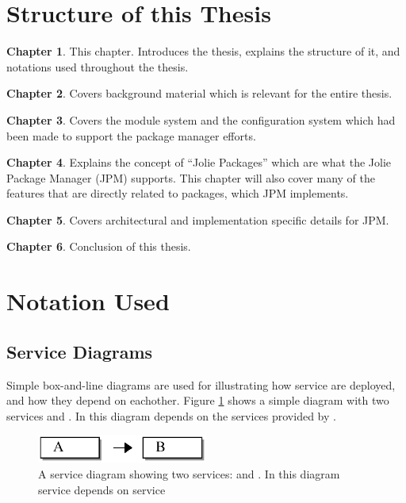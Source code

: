 \section{Structure of this Thesis}

\textbf{Chapter 1}. This chapter. Introduces the thesis, explains the structure
of it, and notations used throughout the thesis.

\textbf{Chapter 2}. Covers background material which is relevant for the entire
thesis.

\textbf{Chapter 3}. Covers the module system and the configuration system which
had been made to support the package manager efforts.

\textbf{Chapter 4}. Explains the concept of ``Jolie Packages'' which are what
the Jolie Package Manager (JPM) supports. This chapter will also cover many
of the features that are directly related to packages, which JPM implements.

\textbf{Chapter 5}. Covers architectural and implementation specific details
for JPM.

\textbf{Chapter 6}. Conclusion of this thesis.

\section{Notation Used}

\subsection*{Service Diagrams}

Simple box-and-line diagrams are used for illustrating how service are
deployed, and how they depend on eachother. Figure
\ref{fig:simple_box_and_line} shows a simple diagram with two services 
and . In this diagram  depends on the services provided by
.

\begin{figure}[H]

\centering
\includegraphics[width=0.5\textwidth]{introduction/simple_box_and_line.eps}

\caption{A service diagram showing two services:  and . In this
    diagram service  depends on service }

\label{fig:simple_box_and_line}

\end{figure}

